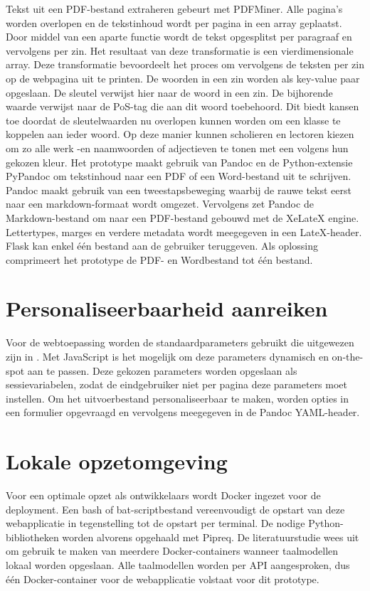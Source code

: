 Tekst uit een PDF-bestand extraheren gebeurt met PDFMiner. Alle pagina's worden overlopen en de tekstinhoud wordt per pagina in een array geplaatst. Door middel van een aparte functie wordt de tekst opgesplitst per paragraaf en vervolgens per zin. Het resultaat van deze transformatie is een vierdimensionale array. Deze transformatie bevoordeelt het proces om vervolgens de teksten per zin op de webpagina uit te printen. De woorden in een zin worden als key-value paar opgeslaan. De sleutel verwijst hier naar de woord in een zin. De bijhorende waarde verwijst naar de PoS-tag die aan dit woord toebehoord. Dit biedt kansen toe doordat de sleutelwaarden nu overlopen kunnen worden om een klasse te koppelen aan ieder woord. Op deze manier kunnen scholieren en lectoren kiezen om zo alle werk -en naamwoorden of adjectieven te tonen met een volgens hun gekozen kleur. Het prototype maakt gebruik van Pandoc en de Python-extensie PyPandoc om tekstinhoud naar een PDF of een Word-bestand uit te schrijven. Pandoc maakt gebruik van een tweestapsbeweging waarbij de rauwe tekst eerst naar een markdown-formaat wordt omgezet. Vervolgens zet Pandoc de Markdown-bestand om naar een PDF-bestand gebouwd met de XeLateX engine. Lettertypes, marges en verdere metadata wordt meegegeven in een LateX-header. Flask kan enkel één bestand aan de gebruiker teruggeven. Als oplossing comprimeert het prototype de PDF- en Wordbestand tot één bestand. 

\section{Personaliseerbaarheid aanreiken}

Voor de webtoepassing worden de standaardparameters gebruikt die uitgewezen zijn in \textcite{Rello2013a, Rello2013b}. Met JavaScript is het mogelijk om deze parameters dynamisch en on-the-spot aan te passen. Deze gekozen parameters worden opgeslaan als sessievariabelen, zodat de eindgebruiker niet per pagina deze parameters moet instellen. Om het uitvoerbestand personaliseerbaar te maken, worden opties in een formulier opgevraagd en vervolgens meegegeven in de Pandoc YAML-header.

\section{Lokale opzetomgeving}

Voor een optimale opzet als ontwikkelaars wordt Docker ingezet voor de deployment. Een bash of bat-scriptbestand vereenvoudigt de opstart van deze webapplicatie in tegenstelling tot de opstart per terminal. De nodige Python-bibliotheken worden alvorens opgehaald met Pipreq. De literatuurstudie wees uit om gebruik te maken van meerdere Docker-containers wanneer taalmodellen lokaal worden opgeslaan. Alle taalmodellen worden per API aangesproken, dus één Docker-container voor de webapplicatie volstaat voor dit prototype.

